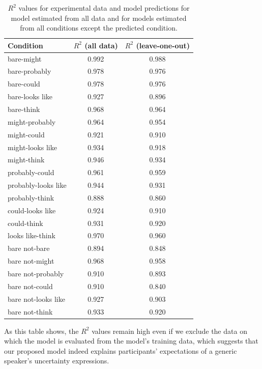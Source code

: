 \documentclass[man, floatsintext]{apa6}
\begin{document}
\begin{table}[ht!]
\center
\begin{tabular}{l | c | c}
      Condition & $R^2$ (all data) & $R^2$ (leave-one-out) \\
      \midrule
          bare-might  &  0.992  & 0.988 \\
       bare-probably  &  0.978  & 0.976 \\
          bare-could  &  0.978  & 0.976 \\
     bare-looks like  &  0.927  & 0.896 \\
          bare-think  &  0.968  & 0.964 \\
      might-probably  &  0.964  & 0.954 \\
         might-could  &  0.921  & 0.910 \\
    might-looks like  &  0.934  & 0.918 \\
         might-think  &  0.946  & 0.934 \\
      probably-could  &  0.961  & 0.959 \\
 probably-looks like  &  0.944  & 0.931 \\
      probably-think  &  0.888  & 0.860 \\
    could-looks like  &  0.924  & 0.910 \\
         could-think  &  0.931  & 0.920 \\
    looks like-think  &  0.970  & 0.960 \\
       bare not-bare  &  0.894  & 0.848 \\
      bare not-might  &  0.968  & 0.958 \\
   bare not-probably  &  0.910  & 0.893 \\
      bare not-could  &  0.910  & 0.840 \\
 bare not-looks like  &  0.927  & 0.903 \\
      bare not-think  &  0.933  & 0.920 \\
\end{tabular}
\caption{$R^2$ values for experimental data and model predictions for model estimated from all data and for models estimated from all conditions except the predicted condition. \label{tbl:correlations}}
\end{table}


As this table shows, the $R^2$ values remain high even if we exclude the data on which the model is evaluated from the model's training data, 
which suggests that our proposed model indeed explains
participants' expectations of a generic speaker's uncertainty expressions.
\end{document}

